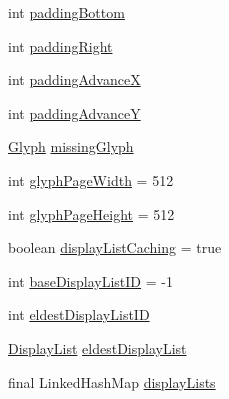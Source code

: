 \begin{DoxyCompactItemize}
\item 
int \mbox{\hyperlink{classorg_1_1newdawn_1_1slick_1_1_unicode_font_a101f8814305c63cba7b7bbb7d1bf87ae}{padding\+Bottom}}
\item 
int \mbox{\hyperlink{classorg_1_1newdawn_1_1slick_1_1_unicode_font_ac488d6ccaeeb1d846fb5fc796a4e4ff2}{padding\+Right}}
\item 
int \mbox{\hyperlink{classorg_1_1newdawn_1_1slick_1_1_unicode_font_a347a5d8b2baa6ab7f037d5f869504883}{padding\+AdvanceX}}
\item 
int \mbox{\hyperlink{classorg_1_1newdawn_1_1slick_1_1_unicode_font_ac04c92b5304822a4187a2e7184f4aca8}{padding\+AdvanceY}}
\item 
\mbox{\hyperlink{classorg_1_1newdawn_1_1slick_1_1font_1_1_glyph}{Glyph}} \mbox{\hyperlink{classorg_1_1newdawn_1_1slick_1_1_unicode_font_aafcdf9a0998520fd22c42754b10c9fcf}{missing\+Glyph}}
\item 
int \mbox{\hyperlink{classorg_1_1newdawn_1_1slick_1_1_unicode_font_a3fe610a3c34ca1aa69a118601e8cb2bc}{glyph\+Page\+Width}} = 512
\item 
int \mbox{\hyperlink{classorg_1_1newdawn_1_1slick_1_1_unicode_font_ac919dac32be8c1baf29a21625e0719b9}{glyph\+Page\+Height}} = 512
\item 
boolean \mbox{\hyperlink{classorg_1_1newdawn_1_1slick_1_1_unicode_font_aad1040617fd0167c54d6dd3511c6bd48}{display\+List\+Caching}} = true
\item 
int \mbox{\hyperlink{classorg_1_1newdawn_1_1slick_1_1_unicode_font_ad3264c179ec09ec85ddd79e09a2d7e89}{base\+Display\+List\+ID}} = -\/1
\item 
int \mbox{\hyperlink{classorg_1_1newdawn_1_1slick_1_1_unicode_font_a093f0c7469fcdddf31407ca64a9beacd}{eldest\+Display\+List\+ID}}
\item 
\mbox{\hyperlink{classorg_1_1newdawn_1_1slick_1_1_unicode_font_1_1_display_list}{Display\+List}} \mbox{\hyperlink{classorg_1_1newdawn_1_1slick_1_1_unicode_font_a0e24f91ddcfbe66103f119572cf75d6d}{eldest\+Display\+List}}
\item 
final Linked\+Hash\+Map \mbox{\hyperlink{classorg_1_1newdawn_1_1slick_1_1_unicode_font_a66750034039374bef370150798d64f95}{display\+Lists}}
\end{DoxyCompactItemize}
